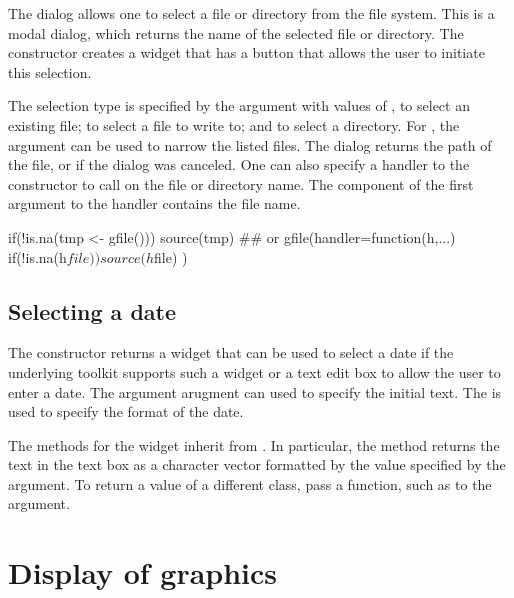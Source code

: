 The  dialog allows one to select a file or directory
from the file system. This is a modal dialog, which returns the name
of the selected file or directory. The 
constructor creates a widget that has a button that allows the user to
initiate this selection.  

The selection type is specified by the  argument with
values of , to select an existing file;  to
select a file to write to; and  to select a
directory. For , the  argument can
be used to narrow the listed files. The dialog returns the path of the
file, or  if the dialog was canceled. One can also specify a
handler to the constructor to call on the file or directory name. The
component  of the first argument to the handler contains
the file name.

\begin{Schunk}
\begin{Sinput}
 if(!is.na(tmp <- gfile())) 
   source(tmp)
 ## or
 gfile(handler=function(h,...) {
   if(!is.na(h$file))
     source(h$file) 
 })   
\end{Sinput}
\end{Schunk}


\subsection{Selecting a date}
\label{sec:gWidgets-selecting-date}

The  constructor returns a widget that can be
used to select a date if the underlying toolkit supports such a widget
or a text edit box to allow the user to enter a date. The argument
 arugment can used to specify the initial
text. The  is used to specify the format
of the date.

The methods for the widget inherit from . In particular,
the  method returns the text in the text box
as a character vector formatted by the value specified by the
 argument. To return a value of a
different class, pass a function, such as  to the
 argument.


\section{Display of graphics}
\label{sec:gWidgets-display-grapics}

